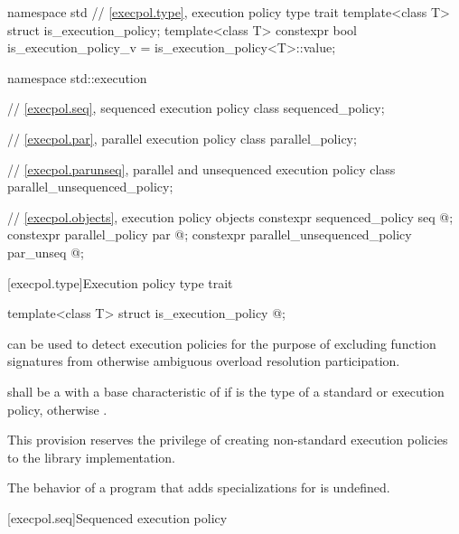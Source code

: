 %
%
\begin{codeblock}
namespace std {
  // \ref{execpol.type}, execution policy type trait
  template<class T> struct is_execution_policy;
  template<class T> constexpr bool is_execution_policy_v = is_execution_policy<T>::value;
}

namespace std::execution {
  // \ref{execpol.seq}, sequenced execution policy
  class sequenced_policy;

  // \ref{execpol.par}, parallel execution policy
  class parallel_policy;

  // \ref{execpol.parunseq}, parallel and unsequenced execution policy
  class parallel_unsequenced_policy;

  // \ref{execpol.objects}, execution policy objects
  constexpr sequenced_policy            seq{ @\unspec@ };
  constexpr parallel_policy             par{ @\unspec@ };
  constexpr parallel_unsequenced_policy par_unseq{ @\unspec@ };
}
\end{codeblock}

[execpol.type]{Execution policy type trait}

%
\begin{itemdecl}
template<class T> struct is_execution_policy { @\seebelow@ };
\end{itemdecl}

\begin{itemdescr}
\pnum
{} can be used to detect execution policies for the
purpose of excluding function signatures from otherwise ambiguous overload
resolution participation.

\pnum
{} shall be a  with a
base characteristic of  if  is the type of a standard
or 
execution policy, otherwise .

\begin{note}
This provision reserves the privilege of creating non-standard execution
policies to the library implementation.
\end{note}

\pnum
The behavior of a program that adds specializations for
 is undefined.
\end{itemdescr}

[execpol.seq]{Sequenced execution policy}

